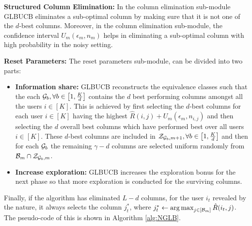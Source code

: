 \textbf{Structured Column Elimination:} In the column elimination sub-module GLBUCB eliminates a sub-optimal column by making sure that it is not one of the $d$-best columns. Moreover, in the column elimination sub-module, the confidence interval $U_m(\epsilon_m, n_m)$  helps in eliminating a sub-optimal column with high probability in the noisy setting. 

\textbf{Reset Parameters:} The reset parameters sub-module, can be divided into two parts: 
\begin{itemize}
\item\textbf{Information share:} GLBUCB reconstructs the equivalence classes such that the each $\mathcal{G}_b,\forall b\in\left[ 1, \frac{K}{d}\right]$ contains the $d$ best performing  columns amongst all the users $i\in[K]$. This is achieved by first selecting the $d$-best columns for each user $i\in[K]$ having the highest $\hat{R}(i,j)  + U_m(\epsilon_m, n_{i,j})$ and then selecting the $d$ overall best columns which have performed best over all users $i\in[K]$. These $d$-best columns are included in $\mathcal{Z}_{\mathcal{G}_b,m+1}, \forall b\in\left[1,\frac{K}{d}\right]$ and then for each $\mathcal{G}_b$ the remaining $\gamma - d$ columns are selected uniform randomly from $\mathcal{B}_m \cap \mathcal{Z}_{\mathcal{G}_b,m}$.

\item\textbf{Increase exploration: } GLBUCB increases the exploration bonus for the next phase so that more exploration is conducted for the surviving columns. 

\end{itemize}

Finally, if the algorithm has eliminated $L-d$ columns, for the user $i_t$ revealed by the nature, it always selects the column $j^*_t$, where $j_t^* \leftarrow \mathop{\rm arg\,max}_{j\in[\mathcal{B}_m]} {\hat{R}(i_t,j)}$. The pseudo-code of this is shown in Algorithm \ref{alg:NGLB}. 




%

